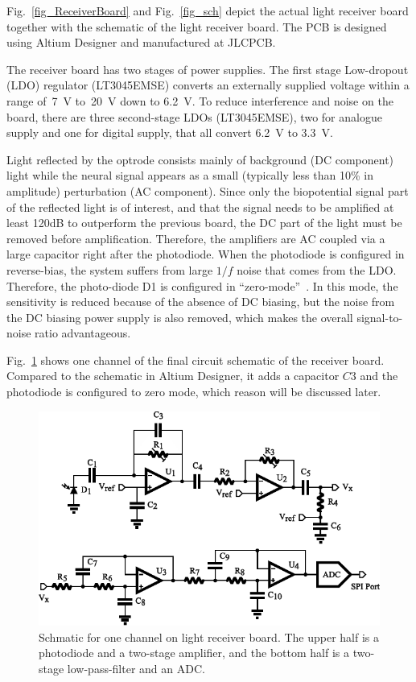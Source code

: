 Fig.~\ref{fig_ReceiverBoard} and Fig.~\ref{fig_sch} depict the actual light receiver board together with the schematic of the light receiver board.  The PCB is designed using Altium Designer and manufactured at JLCPCB.

The receiver board has two stages of power supplies.  The first stage Low-dropout (LDO) regulator (LT3045EMSE) converts an externally supplied voltage within a range of~\qty{7}{V} to~\qty{20}{V} down to \qty{6.2}{V}.  To reduce interference and noise on the board, there are three second-stage LDOs (LT3045EMSE), two for analogue supply and one for digital supply, that all convert \qty{6.2}{V} to \qty{3.3}{V}.

Light reflected by the optrode consists mainly of background (DC component) light while the neural signal appears as a small (typically less than 10\% in amplitude) perturbation (AC component). Since only the biopotential signal part of the reflected light is of interest, and that the signal needs to be amplified at least 120dB to outperform the previous board, the DC part of the light must be removed before amplification.  Therefore, the amplifiers are AC coupled via a large capacitor right after the photodiode. When the photodiode is configured in reverse-bias, the system suffers from large $1/f$ noise that comes from the LDO. Therefore, the photo-diode D1 is configured in ``zero-mode''~\cite{zero-mode_detection}.  In this mode, the sensitivity is reduced because of the absence of DC biasing, but the noise from the DC biasing power supply is also removed, which makes the overall signal-to-noise ratio advantageous.

Fig.~\ref{fig_ReceiverSch} shows one channel of the final circuit schematic of the receiver board.  Compared to the schematic in Altium Designer, it adds a capacitor $C3$ and the photodiode is configured to zero mode, which reason will be discussed later.

\begin{figure}[h]
\centerline{\includegraphics[scale=0.8]{4-ANC_Sys/ReceiverSch.pdf}}
\caption{Schmatic for one channel on light receiver board.  The upper half is a photodiode and a two-stage amplifier, and the bottom half is a two-stage low-pass-filter and an ADC.}
\label{fig_ReceiverSch}
\end{figure}

